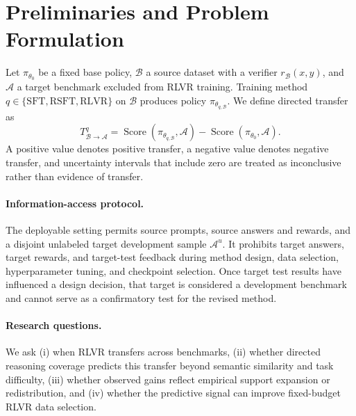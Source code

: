 \section{Preliminaries and Problem Formulation}
\label{sec:problem-formulation}

Let $\pi_{\theta_0}$ be a fixed base policy, $\mathcal{B}$ a source dataset with
a verifier $r_{\mathcal{B}}(x,y)$, and $\mathcal{A}$ a target benchmark excluded
from RLVR training.  Training method $q\in\{\mathrm{SFT},\mathrm{RSFT},
\mathrm{RLVR}\}$ on $\mathcal{B}$ produces policy
$\pi_{\theta_{q,\mathcal{B}}}$.  We define directed transfer as
\begin{equation}
    T^{q}_{\mathcal{B}\rightarrow\mathcal{A}}
    = \operatorname{Score}(\pi_{\theta_{q,\mathcal{B}}},\mathcal{A})
      - \operatorname{Score}(\pi_{\theta_0},\mathcal{A}).
    \label{eq:directed-transfer}
\end{equation}
A positive value denotes positive transfer, a negative value denotes negative
transfer, and uncertainty intervals that include zero are treated as
inconclusive rather than evidence of transfer.

\paragraph{Information-access protocol.}
The deployable setting permits source prompts, source answers and rewards, and
a disjoint unlabeled target development sample $\mathcal{A}^{u}$.  It prohibits
target answers, target rewards, and target-test feedback during method design,
data selection, hyperparameter tuning, and checkpoint selection.  Once target
test results have influenced a design decision, that target is considered a
development benchmark and cannot serve as a confirmatory test for the revised
method.

\paragraph{Research questions.}
We ask (i) when RLVR transfers across benchmarks, (ii) whether directed
reasoning coverage predicts this transfer beyond semantic similarity and task
difficulty, (iii) whether observed gains reflect empirical support expansion
or redistribution, and (iv) whether the predictive signal can improve
fixed-budget RLVR data selection.

